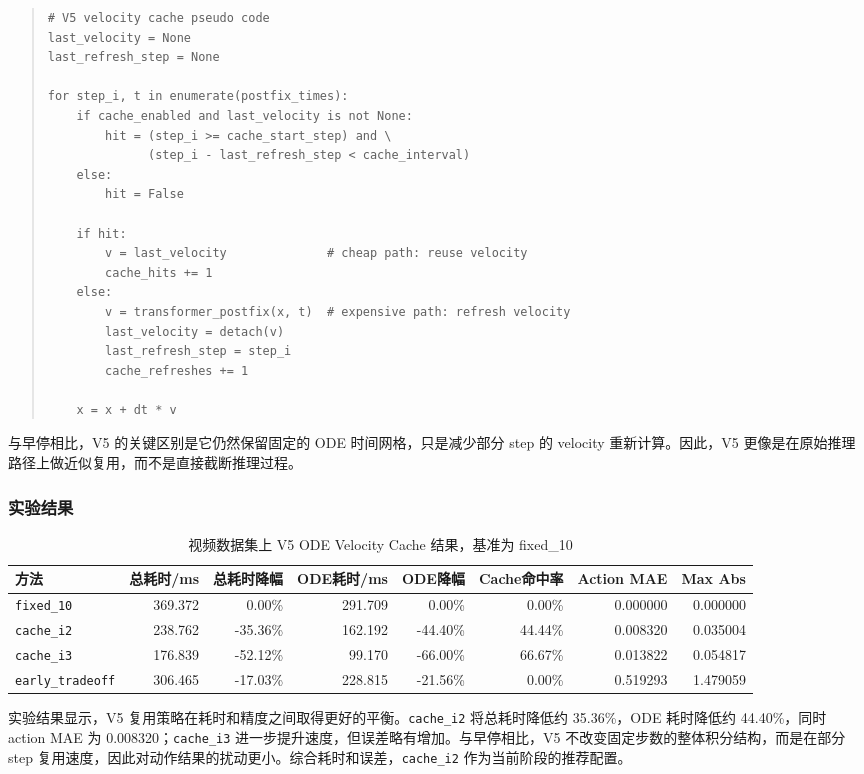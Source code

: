 \documentclass[UTF8,a4paper,12pt]{ctexart}
\begin{document}
\begin{quote}\small
\begin{verbatim}
# V5 velocity cache pseudo code
last_velocity = None
last_refresh_step = None

for step_i, t in enumerate(postfix_times):
    if cache_enabled and last_velocity is not None:
        hit = (step_i >= cache_start_step) and \
              (step_i - last_refresh_step < cache_interval)
    else:
        hit = False

    if hit:
        v = last_velocity              # cheap path: reuse velocity
        cache_hits += 1
    else:
        v = transformer_postfix(x, t)  # expensive path: refresh velocity
        last_velocity = detach(v)
        last_refresh_step = step_i
        cache_refreshes += 1

    x = x + dt * v
\end{verbatim}
\end{quote}

与早停相比，V5 的关键区别是它仍然保留固定的 ODE 时间网格，只是减少部分 step 的 velocity 重新计算。因此，V5 更像是在原始推理路径上做近似复用，而不是直接截断推理过程。

\subsubsection{实验结果}

\begin{table}[htbp]
\centering
\small
\caption{视频数据集上 V5 ODE Velocity Cache 结果，基准为 fixed\_10}
\begin{tabular}{lrrrrrrr}
\toprule
方法 & 总耗时/ms & 总耗时降幅 & ODE耗时/ms & ODE降幅 & Cache命中率 & Action MAE & Max Abs \\
\midrule
\texttt{fixed\_10} & 369.372 & 0.00\% & 291.709 & 0.00\% & 0.00\% & 0.000000 & 0.000000 \\
\texttt{cache\_i2} & 238.762 & -35.36\% & 162.192 & -44.40\% & 44.44\% & 0.008320 & 0.035004 \\
\texttt{cache\_i3} & 176.839 & -52.12\% & 99.170 & -66.00\% & 66.67\% & 0.013822 & 0.054817 \\
\texttt{early\_tradeoff} & 306.465 & -17.03\% & 228.815 & -21.56\% & 0.00\% & 0.519293 & 1.479059 \\
\bottomrule
\end{tabular}
\end{table}

实验结果显示，V5 复用策略在耗时和精度之间取得更好的平衡。\texttt{cache\_i2} 将总耗时降低约 35.36\%，ODE 耗时降低约 44.40\%，同时 action MAE 为 0.008320；\texttt{cache\_i3} 进一步提升速度，但误差略有增加。与早停相比，V5 不改变固定步数的整体积分结构，而是在部分 step 复用速度，因此对动作结果的扰动更小。综合耗时和误差，\texttt{cache\_i2} 作为当前阶段的推荐配置。
\end{document}
